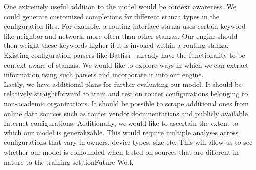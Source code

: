 \documentclass[../thesis.tex]{subfiles}
\begin{document}
One extremely useful addition to the model would be context awareness. We could generate customized completions for different stanza types in the configuration files. For example, a routing interface stanza uses certain keyword like neighbor and network, more often than other stanzas. Our engine should then weight these keywords higher if it is invoked within a routing stanza. Existing configuration parsers like Batfish~\cite{batfish} already have the functionality to be context-aware of stanzas. We would like to explore ways in which we can extract information using such parsers and incorporate it into our engine.\\ 

Lastly, we have additional plans for further evaluating our model. It should be relatively straightforward to train and test on router configurations belonging to non-academic organizations. It should be possible to scrape additional ones from online data sources such as router vendor documentations and publicly available Internet configurations. Additionally, we would like to ascertain the extent to which our model is generalizable. This would require multiple analyses across configurations that vary in owners, device types, size etc. This will allow us to see whether our model is confounded when tested on sources that are different in nature to the training set.tion{Future Work}
\end{document}
